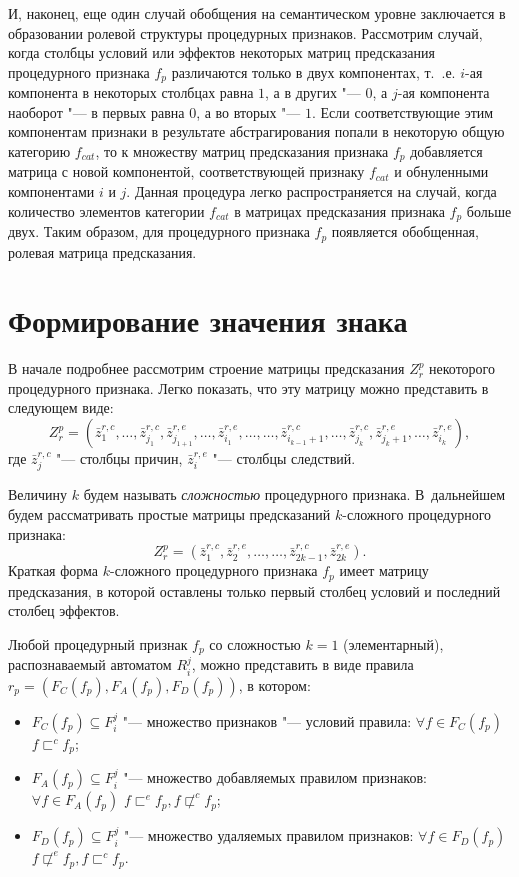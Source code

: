 \documentclass[a4paper, 12pt]{article}
\theoremstyle{break}
\numberwithin{equation}{section}
\begin{document}
	И, наконец, еще один случай обобщения на семантическом уровне заключается в образовании ролевой структуры процедурных признаков. Рассмотрим случай, когда столбцы условий или эффектов некоторых матриц предсказания процедурного признака $f_p$ различаются только в двух компонентах, т.~.е. $i$-ая компонента в некоторых столбцах равна $1$, а в других "--- $0$, а $j$-ая компонента наоборот "--- в первых равна $0$, а во вторых "--- $1$. Если соответствующие этим компонентам признаки в результате абстрагирования попали в некоторую общую категорию $f_{cat}$, то к множеству матриц предсказания признака $f_p$ добавляется матрица с новой компонентой, соответствующей признаку $f_{cat}$ и обнуленными компонентами $i$ и $j$. Данная процедура легко распространяется на случай, когда количество элементов категории $f_{cat}$ в матрицах предсказания признака $f_p$ больше двух. Таким образом, для процедурного признака $f_p$ появляется обобщенная, ролевая матрица предсказания.

	\section{Формирование значения знака} \label{sect:link}
	В начале подробнее рассмотрим строение матрицы предсказания $Z_r^p$ некоторого процедурного признака. Легко показать, что эту матрицу можно представить в следующем виде:
	\begin{equation*}
	Z_r^p=(\bar z_1^{r,c},\dots,\bar z_{j_1}^{r,c},\bar z_{j_{1+1}}^{r,e},\dots,\bar z_{i_1}^{r,e},\dots,\dots,\bar z_{i_{k-1}+1}^{r,c},\dots,\bar z_{j_k}^{r,c},\bar z_{j_k+1}^{r,e},\dots,\bar z_{i_k}^{r,e}),
	\end{equation*}
	где $\bar z_j^{r,c}$ "--- столбцы причин, $\bar z_i^{r,e}$ "--- столбцы следствий. 
	
	Величину $k$ будем называть \textit{сложностью} процедурного признака. В~дальнейшем будем рассматривать простые матрицы предсказаний $k$-сложного процедурного признака:
	\begin{equation*}
	Z_r^p=(\bar z_1^{r,c},\bar z_2^{r,e},\dots,\dots,\bar z_{2k-1}^{r,c},\bar z_{2k}^{r,e}).
	\end{equation*}
	Краткая форма $k$-сложного процедурного признака $f_p$ имеет матрицу предсказания, в которой оставлены только первый столбец условий и последний столбец эффектов.
	
	Любой процедурный признак $f_p$ со сложностью $k=1$ (элементарный), распознаваемый автоматом $R_i^j$, можно представить в виде правила $r_p=(F_C(f_p),F_A(f_p),F_D(f_p))$, в котором:
	\begin{itemize}
		\item $F_C (f_p )\subseteq F_i^j$ "--- множество признаков "--- условий правила: $\forall f\in F_C(f_p)$ $f\sqsubset^c f_p$;
		\item $F_A(f_p)\subseteq F_i^j$ "--- множество добавляемых правилом признаков: $\forall f\in F_A(f_p)$ $f\sqsubset^e f_p,f\not\sqsubset^c f_p$;
		\item $F_D(f_p)\subseteq F_i^j$ "--- множество удаляемых правилом признаков: $\forall f\in F_D(f_p)$ $f\not\sqsubset^e f_p,f\sqsubset^c f_p$.
	\end{itemize}
	
\end{document}
